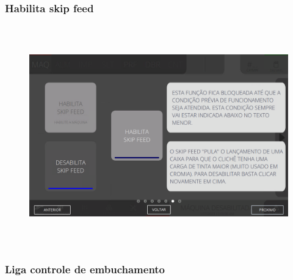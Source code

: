 \vspace*{\fill}

\newpage
\thispagestyle{fancy}

\vspace*{40 pt}

\subsubsection{\small{Habilita skip feed}}

\vspace*{\fill}

\begin{figure}[h]
  \centering
  \includegraphics[width=576px,height=360px]{src/imagesFlexo/02-machine/e-6.png}
\end{figure}

\vspace*{\fill}

\newpage
\thispagestyle{fancy}

\vspace*{40 pt}

\subsubsection{\small{Liga controle de embuchamento}}

\vspace*{\fill}


